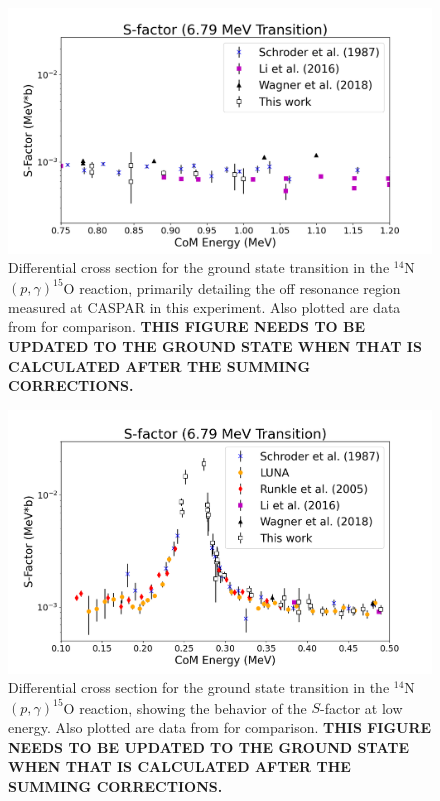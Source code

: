 \begin{figure}
		\includegraphics[width=1.0\linewidth]{figures/highCompare679.png}
	\caption{Differential cross section for the ground state transition in the $^{14}$N$\left( p,\gamma \right) ^{15}$O reaction, primarily detailing the off resonance region measured at CASPAR in this experiment. Also plotted are data from \cite{Schroder1987, Imbriani2005, Runkle2005, Li2016} for comparison. \textbf{THIS FIGURE NEEDS TO BE UPDATED TO THE GROUND STATE WHEN THAT IS CALCULATED AFTER THE SUMMING CORRECTIONS.}  }
	\label{fig: midGS}
\end{figure}



\begin{figure}
		\includegraphics[width=1.0\linewidth]{figures/low679.png}
	\caption{Differential cross section for the ground state transition in the $^{14}$N$\left( p,\gamma \right) ^{15}$O reaction, showing the behavior of the $S$-factor at low energy. Also plotted are data from \cite{Schroder1987, Imbriani2005, Runkle2005, Li2016} for comparison. \textbf{THIS FIGURE NEEDS TO BE UPDATED TO THE GROUND STATE WHEN THAT IS CALCULATED AFTER THE SUMMING CORRECTIONS.} }
	\label{fig: lowGS}
\end{figure}

